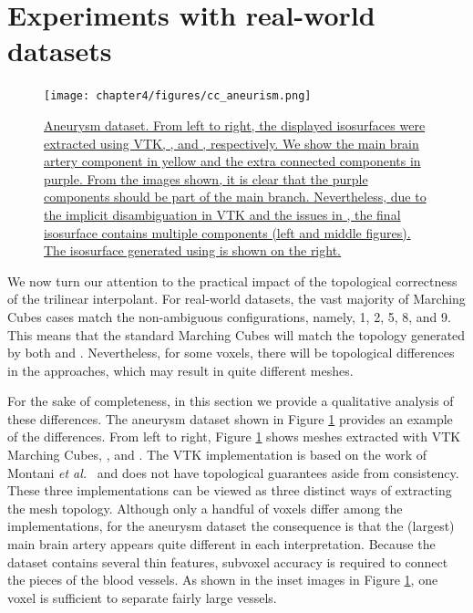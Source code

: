 \section{Experiments with real-world datasets}
\label{sec:real-world}

\begin{figure}[b]
     \centering
     \texttt{[image: chapter4/figures/cc\_aneurism.png]}
     \caption{\href{http://liscustodio.github.io/C_MC33/figure12.html}{Aneurysm dataset. From left to right, the displayed isosurfaces were extracted using VTK, \mc, and \cmc, respectively. We show the main brain artery component in yellow and the extra connected components in purple. From the images shown, it is clear that the purple components should be part of the main branch. Nevertheless, due to the implicit disambiguation in VTK and the issues in \mc, the final isosurface contains multiple components (left and middle figures). The isosurface generated using \cmc{} is shown on the right\cite{lisOnline2013}.}}
     \label{fig:cc_aneurism}
\end{figure}

We now turn our attention to the practical impact of the topological correctness of the trilinear interpolant. 
For real-world datasets, the vast majority of Marching Cubes cases match the non-ambiguous configurations, namely, 1, 2, 5, 8, and 9. This means that the standard Marching Cubes will match the topology generated by both \mc{} and \cmc.
%
Nevertheless, for some voxels, there will be topological differences in the approaches, which may result in quite different meshes. 

For the sake of completeness, in this section we provide a qualitative analysis of these differences. The aneurysm dataset shown in Figure \ref{fig:cc_aneurism} provides an example of the differences. From left to right, Figure \ref{fig:cc_aneurism} shows meshes extracted with VTK Marching Cubes, \mc, and \cmc. The VTK implementation is based on the work of Montani \emph{et al.}~\cite{Montani:1994wp} and does not have topological guarantees aside from consistency. These three implementations can be viewed as three distinct ways of extracting the mesh topology.
%
Although only a handful of voxels differ among the implementations, for the aneurysm dataset the consequence is that the (largest) main brain artery appears quite different in each interpretation. Because the dataset contains several thin features, subvoxel accuracy is required to connect the pieces of the blood vessels. As shown in the inset images in Figure \ref{fig:cc_aneurism}, one voxel is sufficient to separate fairly large vessels.

